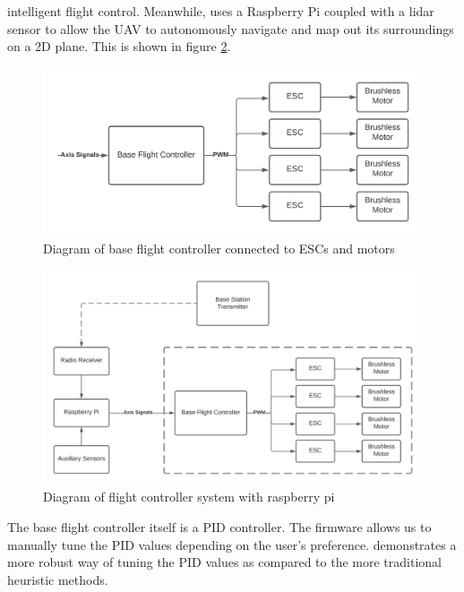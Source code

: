\documentclass[english]{upeeei}
\begin{document}
intelligent flight control. Meanwhile, \cite{Dowling2018} uses a Raspberry Pi coupled with a lidar sensor to allow the UAV
to autonomously navigate and map out its surroundings on a 2D plane. This is shown in figure \ref{fig:FC_system_diagram}.
\begin{figure}[h]
    \centering
    \includegraphics[scale=0.5]{images/base_FC_diagram.png}
    \caption{Diagram of base flight controller connected to ESCs and motors}
    \label{fig:base_FC_diagram}
\end{figure}
\begin{figure}[h]
    \centering
    \includegraphics[scale=0.5]{images/fc_with_rpi.png}
    \caption{Diagram of flight controller system with raspberry pi}
    \label{fig:FC_system_diagram}
\end{figure}
The base flight controller itself is a PID controller. The firmware allows us to manually tune the PID values depending 
on the user's preference. \cite{Tuning2017} demonstrates a more robust way of tuning the PID values as compared to the
more traditional heuristic methods.
\end{document}
